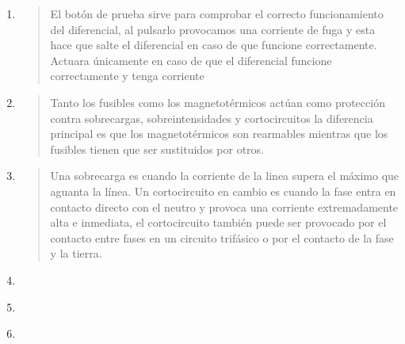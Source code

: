 \documentclass[spanish,openany]{report}
\begin{document}
\begin{enumerate}
  \item {}

  \begin{quote}
	  El botón de prueba sirve para comprobar el correcto funcionamiento del diferencial, al pulsarlo provocamos una corriente de fuga y esta hace 
	  que salte el diferencial en caso de que funcione correctamente. Actuara únicamente en caso de que el diferencial funcione correctamente y 
	  tenga corriente
  \end{quote}

  \item {}

  \begin{quote}
	  Tanto los fusibles como los magnetotérmicos actúan como protección contra sobrecargas, sobreintensidades y cortocircuitos
	  la diferencia principal es que los magnetotérmicos son 
	  rearmables mientras que los fusibles tienen que ser sustituidos por otros.
  \end{quote}
\clearpage
  \item {}

  \begin{quote}
	  Una sobrecarga es cuando la corriente de la linea supera el máximo que aguanta la línea. Un cortocircuito en cambio es cuando la fase entra
	  en contacto directo con el neutro y provoca una corriente extremadamente alta e inmediata, el cortocircuito también puede ser provocado por
	  el contacto entre fases en un circuito trifásico o por el contacto de la fase y la tierra.
  \end{quote}

  \item {}

  \begin{quote}
  \end{quote}

  \item {}

  \begin{quote}
  \end{quote}

  \item {}


\end{enumerate}
\end{document}
